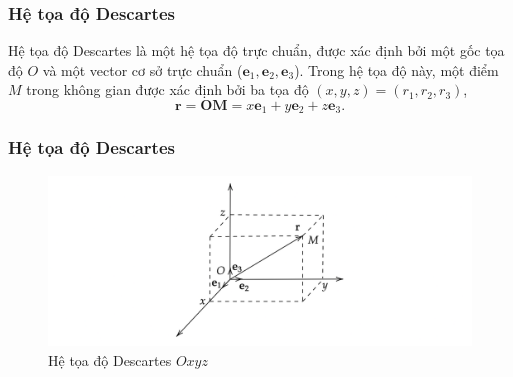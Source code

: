 \begin{frame}
\frametitle{Hệ tọa độ Descartes}
\begin{tcolorbox}[colback=blue!10, colframe=blue!50!black, title=Định nghĩa]
    Hệ tọa độ Descartes là một hệ tọa độ trực chuẩn, được xác định bởi một gốc tọa độ \(O\) và một vector cơ sở trực chuẩn (\(\mathbf{e}_1, \mathbf{e}_2, \mathbf{e}_3\)). Trong hệ tọa độ này, một điểm \(M\) trong không gian được xác định bởi ba tọa độ \((x, y, z)=(r_1, r_2, r_3)\),
    \begin{equation}
        \mathbf{r}=\mathbf{OM} = x\mathbf{e}_1 + y\mathbf{e}_2 + z\mathbf{e}_3.
    \end{equation}
\end{tcolorbox}
\end{frame}

\begin{frame}
\frametitle{Hệ tọa độ Descartes}
\begin{figure}
\centering
\includegraphics[width=1\textwidth]{Slides/Figure/toadodescartes.png}
\caption{Hệ tọa độ Descartes \(Oxyz\)}
\end{figure}
\end{frame}